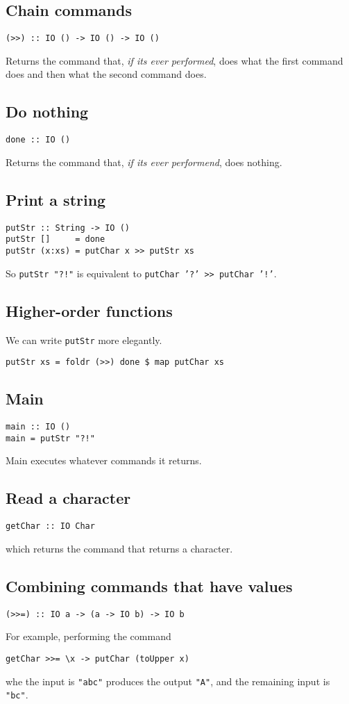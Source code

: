 \documentclass{article}
\begin{document}
\subsection{Chain commands}
\begin{verbatim}
(>>) :: IO () -> IO () -> IO ()
\end{verbatim}
Returns the command that, \emph{if its ever performed}, does what the first command does and then what the second command does.
\subsection{Do nothing}
\begin{verbatim}
done :: IO ()
\end{verbatim}
Returns the command that, \emph{if its ever performend}, does nothing.
\subsection{Print a string}
\begin{verbatim}
putStr :: String -> IO ()
putStr []     = done
putStr (x:xs) = putChar x >> putStr xs
\end{verbatim}
So \texttt{putStr "?!"} is equivalent to \texttt{putChar '?' >> putChar '!'}.
\subsection{Higher-order functions}
We can write \texttt{putStr} more elegantly.
\begin{verbatim}
putStr xs = foldr (>>) done $ map putChar xs
\end{verbatim}
\subsection{Main}
\begin{verbatim}
main :: IO ()
main = putStr "?!"
\end{verbatim}
Main executes whatever commands it returns.
\subsection{Read a character}
\begin{verbatim}
getChar :: IO Char
\end{verbatim}
which returns the command that returns a character.
\subsection{Combining commands that have values}
\begin{verbatim}
(>>=) :: IO a -> (a -> IO b) -> IO b
\end{verbatim}
For example, performing the command
\begin{verbatim}
getChar >>= \x -> putChar (toUpper x)
\end{verbatim}
whe the input is \texttt{"abc"} produces the output \texttt{"A"}, and the remaining input is \texttt{"bc"}.
\end{document}
